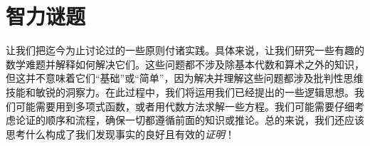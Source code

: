 \section{智力谜题}\label{sec:section1.4}

让我们把迄今为止讨论过的一些原则付诸实践。具体来说，让我们研究一些有趣的数学难题并解释如何解决它们。这些问题都不涉及除基本代数和算术之外的知识，但这并不意味着它们``基础''或``简单''，因为解决并理解这些问题都涉及批判性思维技能和敏锐的洞察力。在此过程中，我们将运用我们已经提出的一些逻辑思想。我们可能需要用到多项式函数，或者用代数方法求解一些方程。我们可能需要仔细考虑论证的顺序和流程，确保一切都遵循前面的知识或推论。总的来说，我们还应该思考什么构成了我们发现事实的良好且有效的\emph{证明}！










